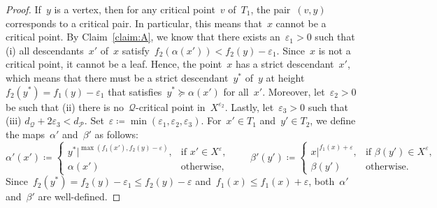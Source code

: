 \documentclass[a4paper,UKenglish, autoref, thm-restate, cleveref]{lipics-v2021}
\newcommand{\an}[2]{#1|^{#2}}
\newcommand{\resdist}[1]{d_{#1}}
\newcommand{\eps}{\varepsilon}
\renewcommand{\P}{\mathcal{P}}
\newcommand{\Q}{\mathcal{Q}}
\begin{document}
\begin{proof}
    If~$y$ is a vertex, then for any critical point~$v$ of~$T_1$, the pair~$(v, y)$ corresponds to a critical pair.
    In particular, this means that~$x$ cannot be a critical point.
    By Claim~\ref{claim:A}, we know that there exists an~$\eps_1 > 0$ such that (i) all descendants~$x'$ of~$x$ satisfy~$f_2(\alpha(x')) < f_2(y) - \eps_1$.
    Since~$x$ is not a critical point, it cannot be a leaf.
    Hence, the point~$x$ has a strict descendant~$x'$, which means that there must be a strict descendant~$y^*$ of~$y$ at height~$f_2(y^*) = f_1(y) - \eps_1$ that satisfies~$y^* \succeq \alpha(x')$ for all~$x'$.
    Moreover, let~$\eps_2 > 0$ be such that (ii) there is no~$\Q$-critical point in~$X^{\eps_2}$.
    Lastly, let~$\eps_3 > 0$ such that (iii) $\resdist{\Q} + 2\eps_3 < \resdist{\P}$.
    Set~$\eps \coloneqq \min(\eps_1, \eps_2, \eps_3)$.
    For~$x' \in T_1$ and~$y' \in T_2$, we define the maps~$\alpha'$ and~$\beta'$ as follows:
    \[
        \alpha'(x') \coloneqq \begin{cases}
            \an{y^*}{\max(f_1(x'), f_2(y)-\eps)}, & \text{if } x' \in X^\eps, \\
            \alpha(x') & \text{otherwise,}
        \end{cases} \qquad
        \beta'(y') \coloneqq \begin{cases}
            \an{x}{f_1(x) + \eps}, & \text{if } \beta(y') \in X^\eps, \\
            \beta(y') & \text{otherwise.}
        \end{cases}
    \]
    Since~$f_2(y^*) = f_2(y) - \eps_1 \le f_2(y) - \eps$ and~$f_1(x) \le f_1(x) + \eps$, both~$\alpha'$ and~$\beta'$ are well-defined.

    

\end{proof}
\end{document}
